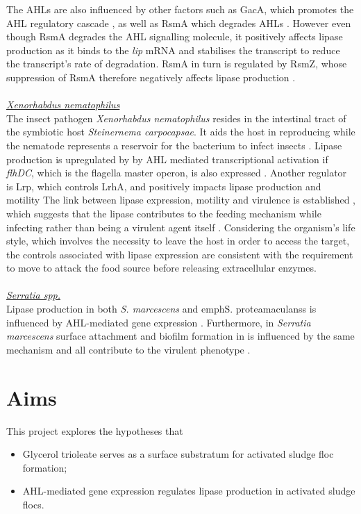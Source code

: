 \documentclass{article}
\begin{document}
The AHLs are also influenced by other factors such as GacA, which promotes the AHL regulatory cascade \cite{reimmann1997}, as well as RsmA which degrades AHLs \cite{pessi2001}. However even though RsmA degrades the AHL signalling molecule, it positively affects lipase production as it binds to the \textit{lip} mRNA and stabilises the transcript to reduce the transcript's rate of degradation. RsmA in turn is regulated by RsmZ, whose suppression of RsmA therefore negatively affects lipase production \cite{heurlier2004}. 
\\
\\ \emph{\underline{Xenorhabdus nematophilus}} 
\\The insect pathogen \emph{Xenorhabdus nematophilus} resides in the intestinal tract of the symbiotic host \emph{Steinernema carpocapsae}. It aids the host in reproducing while the nematode represents a reservoir for the bacterium to infect insects \cite{herbert2007}. Lipase production is upregulated by  by AHL mediated transcriptional activation \cite{dunphy_97} if \emph{flhDC}, which is the flagella master operon, is also expressed \cite{rosenau2000}. Another regulator is Lrp, which controls LrhA, and positively impacts lipase production and motility \cite{richards2008} 
The link between lipase expression, motility and virulence is established \cite{givaudan_00}, which suggests that the lipase contributes to the feeding mechanism while infecting rather than being a virulent agent itself \cite{richards2010}. Considering the organism's life style, which involves the necessity to leave the host in order to access the target, the controls associated with lipase expression are consistent with the requirement to move to attack the food source before releasing extracellular enzymes.
\\
\\ \emph{\underline{Serratia spp.}} 
\\Lipase production in both \emph{S. marcescens} and emph{S. proteamaculanss} is influenced by AHL-mediated gene expression \cite{horng2002,shibatani2000,christensen_03}. Furthermore, in \emph{Serratia marcescens} surface attachment and biofilm formation in  is influenced by the same mechanism \cite{labbate2007} and all contribute to the virulent phenotype \cite{hejazi_97}.

\newpage
\section{Aims}
This project explores the hypotheses that 
\begin{itemize}
\item Glycerol trioleate serves as a surface substratum for activated sludge floc formation;
\item AHL-mediated gene expression regulates lipase production in activated sludge flocs.
\end{itemize}
\end{document}
